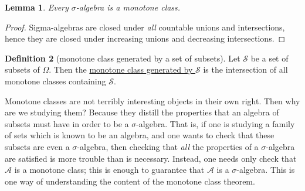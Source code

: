 \documentclass[a4paper,12pt]{scrreprt}
\newcommand{\defn}[1]{\ul{#1}}
\theoremstyle{definition}
\newtheorem{definition}{Definition}
\theoremstyle{plain}
\newtheorem{lemma}[definition]{Lemma}
\theoremstyle{remark}
\begin{document}
\begin{lemma}
  Every $\sigma$-algebra is a monotone class.
\end{lemma}
\begin{proof}
  Sigma-algebras are closed under \emph{all} countable unions and intersections, hence they are closed under increasing unions and decreasing intersections.
\end{proof}

\begin{definition}[monotone class generated by a set of subsets]
  \label{def:monotoneclassgeneratedbyaset}
  Let $\mathcal{S}$ be a set of subsets of $\Omega$. Then the \defn{monotone class generated by $\mathcal{S}$} is the intersection of all monotone classes containing $\mathcal{S}$.
\end{definition}

Monotone classes are not terribly interesting objects in their own right. Then why are we studying them? Because they distill the properties that an algebra of subsets must have in order to be a $\sigma$-algebra. That is, if one is studying a family of sets which is known to be an algebra, and one wants to check that these subsets are even a $\sigma$-algebra, then checking that \emph{all} the properties of a $\sigma$-algebra are satisfied is more trouble than is necessary. Instead, one needs only check that $\mathcal{A}$ is a monotone class; this is enough to guarantee that $\mathcal{A}$ is a $\sigma$-algebra. This is one way of understanding the content of the monotone class theorem.
\end{document}
